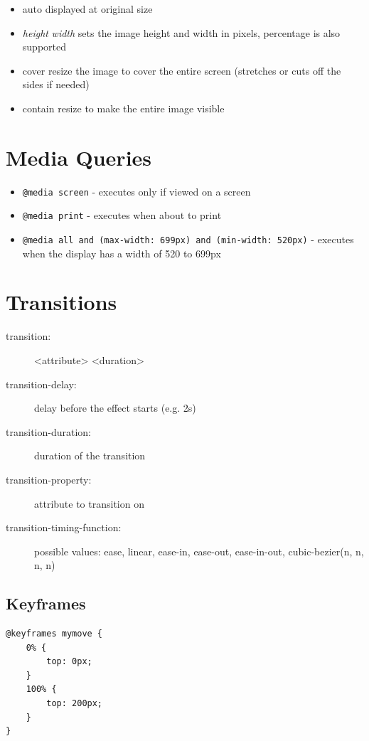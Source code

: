 \documentclass[12pt, a4paper]{article}
\begin{document}
\begin{multicols}{2}
\begin{description}
			\begin{itemize}
				\item auto
				\subitem displayed at original size
				\item \textit{height} \textit{width}
				\subitem sets the image height and width in pixels, percentage is also supported
				\item cover
				\subitem resize the image to cover the entire screen (stretches or cuts off the sides if needed)
				\item contain
				\subitem resize to make the entire image visible
			\end{itemize}
		\end{description}
		
		\section{Media Queries}
		\begin{itemize}
			\item\texttt{@media screen} - executes only if viewed on a screen
			\item\texttt{@media print} - executes when about to print
			\item\texttt{@media all and (max-width: 699px) and (min-width: 520px)} - executes when the display has a width of 520 to 699px
		\end{itemize}
		
		\section{Transitions}
		\begin{description}
			\item[transition:] <attribute> <duration>
			\item[transition-delay:] delay before the effect starts (e.g. 2s)
			\item[transition-duration:] duration of the transition
			\item[transition-property:] attribute to transition on
			\item[transition-timing-function:] possible values: ease, linear, ease-in, ease-out, ease-in-out, cubic-bezier(n, n, n, n)
		\end{description}
		
		\subsection{Keyframes}
		\begin{center}
			\begin{minipage}{0.9\linewidth}
				\begin{lstlisting}
@keyframes mymove {
	0% {
		top: 0px;
	}
	100% {
		top: 200px;
	}
}


\end{lstlisting}
\end{minipage}
\end{center}
\end{multicols}
\end{document}
